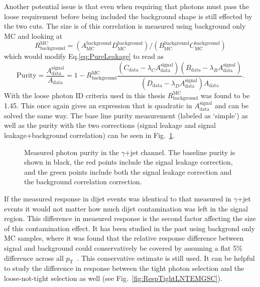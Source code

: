 Another potential issue is that even when requiring that photons must pass the loose requirement before being included the background shape is still effected by the two cuts.  
The size is of this correlation is measured using background only MC and looking at 
\begin{equation}
 R^{\mathrm{MC}}_{\mathrm {background}}= \left(A_{\mathrm{MC}}^{\mathrm{background}}D_{\mathrm{MC}}^{\mathrm{background}}\right)/\left(B_{\mathrm{MC}}^{\mathrm{background}}C_{\mathrm{MC}}^{\mathrm{background}}\right) 
\end{equation} 
which would modify Eq.\ref{eq:PureLeakage} to read as
\begin{equation}
  \mathrm{Purity} = \frac{A_{\mathrm{data}}^{\mathrm{signal}}}{A_{\mathrm{data}}} = 1-R^{\mathrm{MC}}_{\mathrm {background}}\frac{\left(C_{\mathrm{data}}-\lambda_CA_{\mathrm{data}}^{\mathrm{signal}}\right)\left(B_{\mathrm{data}}-\lambda_BA_{\mathrm{data}}^{\mathrm{signal}}\right)}{\left(D_{\mathrm{data}}-\lambda_DA_{\mathrm{data}}^{\mathrm{signal}}\right)A_{\mathrm{data}}}.  
\end{equation}
With the loose photon ID criteria used in this thesis $R^{\mathrm{MC}}_{\mathrm {background}}$ was found to be 1.45.  
This once again gives an expression that is quadratic in $A_{\mathrm{data}}^{\mathrm{signal}}$ and can be solved the same way.  
The base line purity measurement (labeled as `simple') as well as the purity with the two corrections (signal leakage and signal leakage+background correlation) can be seen in Fig.~\ref{fig:PurityMeas}.  
\begin{figure}[!ht]
 \begin{center}
 \end{center}
 \caption[$\gamma$+jet purity measurement]
 {\small Measured photon purity in the $\gamma$+jet channel.  The baseline purity is shown in black, the red points include the signal leakage correction, and the green points include both the signal leakage correction and the background correlation correction. }
 \label{fig:PurityMeas}
\end{figure}

If the measured response in dijet events was identical to that measured in $\gamma$+jet events it would not matter how much dijet contamination was left in the signal region.  
This difference in measured response is the second factor affecting the size of this contamination effect.  
It has been studied in the past using backgrond only MC samples, where it was found that the relative response difference between signal and background could conservatively be covered by assuming a flat 5\% difference across all $p_{\mathrm T}$~\cite{ATLAS-CONF-2012-063}.  
This conservative estimate is still used.  
It can be helpful to study the difference in response between the tight photon selection and the loose-not-tight selection as well (see Fig.~\ref{fig:RespTightLNTEMGSC}).  



